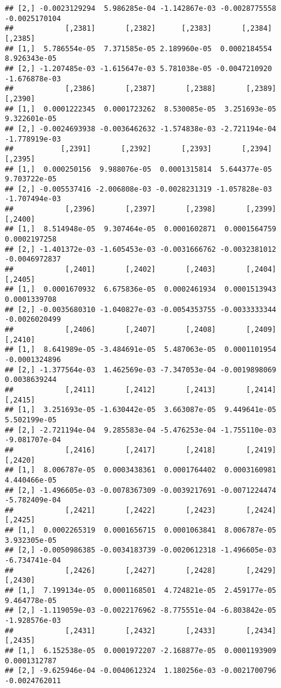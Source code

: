 \documentclass[
]{article}
\begin{document}
\begin{verbatim}
## [2,] -0.0023129294  5.986285e-04 -1.142867e-03 -0.0028775558 -0.0025170104
##            [,2381]       [,2382]      [,2383]       [,2384]       [,2385]
## [1,]  5.786554e-05  7.371585e-05 2.189960e-05  0.0002184554  8.926343e-05
## [2,] -1.207485e-03 -1.615647e-03 5.781038e-05 -0.0047210920 -1.676878e-03
##            [,2386]       [,2387]       [,2388]       [,2389]       [,2390]
## [1,]  0.0001222345  0.0001723262  8.530085e-05  3.251693e-05  9.322601e-05
## [2,] -0.0024693938 -0.0036462632 -1.574838e-03 -2.721194e-04 -1.778919e-03
##           [,2391]       [,2392]       [,2393]       [,2394]       [,2395]
## [1,]  0.000250156  9.988076e-05  0.0001315814  5.644377e-05  9.703722e-05
## [2,] -0.005537416 -2.006808e-03 -0.0028231319 -1.057828e-03 -1.707494e-03
##            [,2396]       [,2397]       [,2398]       [,2399]       [,2400]
## [1,]  8.514948e-05  9.307464e-05  0.0001602871  0.0001564759  0.0002197258
## [2,] -1.401372e-03 -1.605453e-03 -0.0031666762 -0.0032381012 -0.0046972837
##            [,2401]       [,2402]       [,2403]       [,2404]       [,2405]
## [1,]  0.0001670932  6.675836e-05  0.0002461934  0.0001513943  0.0001339708
## [2,] -0.0035680310 -1.040827e-03 -0.0054353755 -0.0033333344 -0.0026020499
##            [,2406]       [,2407]       [,2408]       [,2409]       [,2410]
## [1,]  8.641989e-05 -3.484691e-05  5.487063e-05  0.0001101954 -0.0001324896
## [2,] -1.377564e-03  1.462569e-03 -7.347053e-04 -0.0019898069  0.0038639244
##            [,2411]       [,2412]       [,2413]       [,2414]       [,2415]
## [1,]  3.251693e-05 -1.630442e-05  3.663087e-05  9.449641e-05  5.502199e-05
## [2,] -2.721194e-04  9.285583e-04 -5.476253e-04 -1.755110e-03 -9.081707e-04
##            [,2416]       [,2417]       [,2418]       [,2419]       [,2420]
## [1,]  8.006787e-05  0.0003438361  0.0001764402  0.0003160981  4.440466e-05
## [2,] -1.496605e-03 -0.0078367309 -0.0039217691 -0.0071224474 -5.782409e-04
##            [,2421]       [,2422]       [,2423]       [,2424]       [,2425]
## [1,]  0.0002265319  0.0001656715  0.0001063841  8.006787e-05  3.932305e-05
## [2,] -0.0050986385 -0.0034183739 -0.0020612318 -1.496605e-03 -6.734741e-04
##            [,2426]       [,2427]       [,2428]       [,2429]       [,2430]
## [1,]  7.199134e-05  0.0001168501  4.724821e-05  2.459177e-05  9.464778e-05
## [2,] -1.119059e-03 -0.0022176962 -8.775551e-04 -6.803842e-05 -1.928576e-03
##            [,2431]       [,2432]       [,2433]       [,2434]       [,2435]
## [1,]  6.152538e-05  0.0001972207 -2.168877e-05  0.0001193909  0.0001312787
## [2,] -9.625946e-04 -0.0040612324  1.180256e-03 -0.0021700796 -0.0024762011

\end{verbatim}
\end{document}
